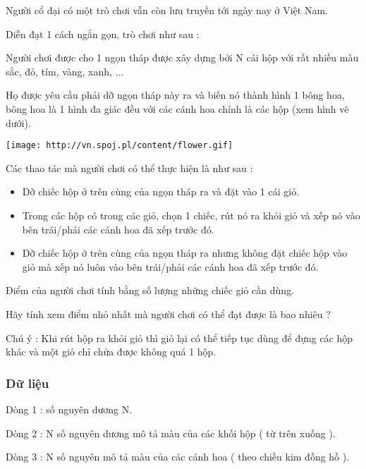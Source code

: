 

                 Người cổ đại có một trò chơi vẫn còn lưu truyền tới ngày nay ở   Việt Nam.   


   Diễn đạt 1 cách ngắn gọn, trò chơi như sau :   


   Người chơi được cho 1 ngọn tháp được xây dựng bởi N cái   hộp với rất nhiều màu sắc, đỏ, tím, vàng, xanh, ...   


   Họ được yêu cầu phải dỡ ngọn tháp này ra và biến nó thành   hình 1 bông hoa, bông hoa là 1 hình đa giác đều với các cánh   hoa chính là các hộp (xem hình vẽ dưới).   



\texttt{[image: http://vn.spoj.pl/content/flower.gif]}




   Các thao tác mà người chơi có thể thực hiện là như sau :   



\begin{itemize}
	\item     Dỡ chiếc hộp ở trên cùng của ngọn tháp ra và đặt vào 1 cái   giỏ.   
	\item     Trong các hộp có trong các giỏ, chọn 1 chiếc, rút nó ra   khỏi giỏ và xếp nó vào bên trái/phải các cánh hoa đã xếp trước   đó.   
	\item     Dỡ chiếc hộp ở trên cùng của ngọn tháp ra nhưng không   đặt chiếc hộp vào giỏ mà xếp nó luôn vào bên trái/phải các   cánh hoa đã xếp trước đó.   
\end{itemize}

   Điểm của người chơi tính bằng số lượng những chiếc giỏ cần   dùng.   


   Hãy tính xem điểm nhỏ nhất mà người chơi có thể đạt được là   bao nhiêu ?   





       Chú ý      : Khi rút hộp ra khỏi giỏ thì giỏ lại có thể tiếp   tục dùng để đựng các hộp khác và một giỏ chỉ chứa được   không quá 1 hộp.   




\subsubsection{   Dữ liệu  }

   Dòng 1 : số nguyên dương N.   


   Dòng 2 : N số nguyên dương mô tả màu của các khối hộp ( từ   trên xuống ).   


   Dòng 3 : N số nguyên mô tả màu của các cánh hoa ( theo chiều   kim đồng hồ ).  

